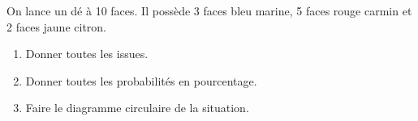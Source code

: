 On lance un dé à 10 faces. Il possède 3 faces bleu marine, 5 faces rouge carmin et 2 faces jaune citron.
\begin{enumerate}
    \item Donner toutes les issues.
    \item Donner toutes les probabilités en pourcentage.
    \item Faire le diagramme circulaire de la situation.
\end{enumerate}